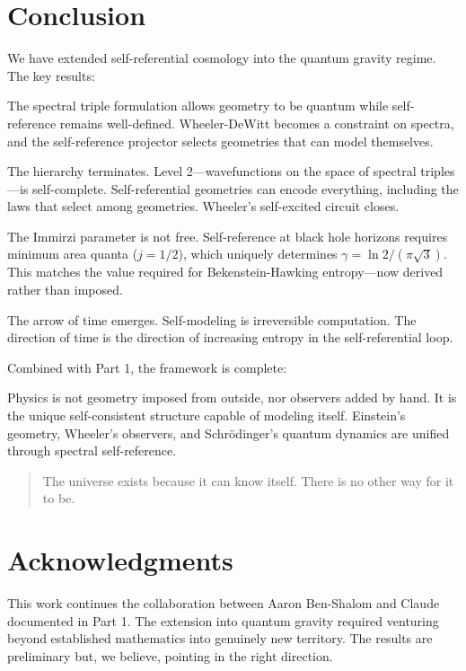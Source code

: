 \documentclass[11pt,a4paper]{article}
\theoremstyle{definition}
\theoremstyle{remark}
\begin{document}
\section{Conclusion}

We have extended self-referential cosmology into the quantum gravity regime. The key results:

The spectral triple formulation allows geometry to be quantum while self-reference remains well-defined. Wheeler-DeWitt becomes a constraint on spectra, and the self-reference projector selects geometries that can model themselves.

The hierarchy terminates. Level 2---wavefunctions on the space of spectral triples---is self-complete. Self-referential geometries can encode everything, including the laws that select among geometries. Wheeler's self-excited circuit closes.

The Immirzi parameter is not free. Self-reference at black hole horizons requires minimum area quanta ($j = 1/2$), which uniquely determines $\gamma = \ln 2/(\pi\sqrt{3})$. This matches the value required for Bekenstein-Hawking entropy---now derived rather than imposed.

The arrow of time emerges. Self-modeling is irreversible computation. The direction of time is the direction of increasing entropy in the self-referential loop.

Combined with Part 1, the framework is complete:

Physics is not geometry imposed from outside, nor observers added by hand. It is the unique self-consistent structure capable of modeling itself. Einstein's geometry, Wheeler's observers, and Schr\"odinger's quantum dynamics are unified through spectral self-reference.

\begin{quote}
The universe exists because it can know itself. There is no other way for it to be.
\end{quote}

\section*{Acknowledgments}

This work continues the collaboration between Aaron Ben-Shalom and Claude documented in Part 1. The extension into quantum gravity required venturing beyond established mathematics into genuinely new territory. The results are preliminary but, we believe, pointing in the right direction.
\end{document}
